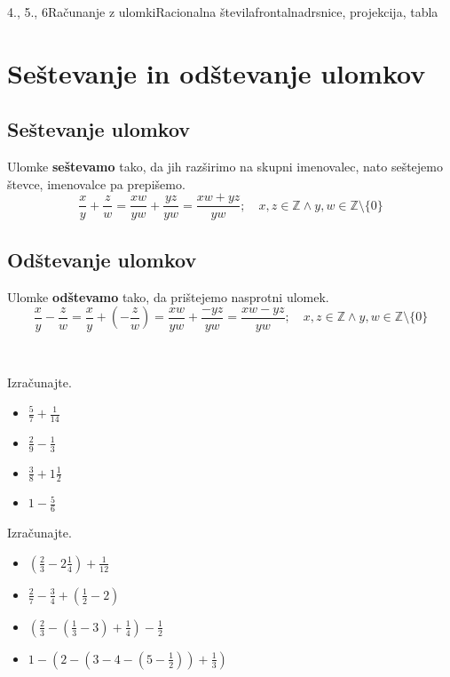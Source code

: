 \begin{priprava}{4., 5., 6}{}{Računanje z ulomki}{Racionalna števila}{frontalna}{drsnice, projekcija, tabla}

    \section{Seštevanje in odštevanje ulomkov}

        
    \subsection*{Seštevanje ulomkov}
        Ulomke \textbf{seštevamo} tako, da jih razširimo na skupni imenovalec, nato seštejemo števce, imenovalce pa prepišemo.
        $$\dfrac{x}{y}+\dfrac{z}{w}=\dfrac{xw}{yw}+\dfrac{yz}{yw}=\dfrac{xw+yz}{yw}; \quad x,z\in\mathbb{Z}\land y,w\in\mathbb{Z}\setminus\{0\} $$
    

    \subsection*{Odštevanje ulomkov}
        Ulomke \textbf{odštevamo} tako, da prištejemo nasprotni ulomek.
        $$\dfrac{x}{y}-\dfrac{z}{w}=\dfrac{x}{y}+\left(-\dfrac{z}{w}\right)=\dfrac{xw}{yw}+\dfrac{-yz}{yw}=\dfrac{xw-yz}{yw}; \quad x,z\in\mathbb{Z}\land y,w\in\mathbb{Z}\setminus\{0\} $$
    



    ~\\


    \begin{naloga}
        Izračunajte.
        \begin{itemize}
            \item $\frac{5}{7}+\frac{1}{14}$ 
            \item $\frac{2}{9}-\frac{1}{3}$ 
            \item $\frac{3}{8}+1\frac{1}{2}$ 
            \item $1-\frac{5}{6}$ 
        \end{itemize}
    \end{naloga}



    \begin{naloga}
        Izračunajte.
        \begin{itemize}
            \item $\left(\frac{2}{3}-2\frac{1}{4}\right)+\frac{1}{12}$ 
            \item $\frac{2}{7}-\frac{3}{4}+\left(\frac{1}{2}-2\right)$ 
            \item $\left(\frac{2}{3}-\left(\frac{1}{3}-3\right)+\frac{1}{4}\right)-\frac{1}{2}$ 
            \item $1-\left(2-\left(3-4-\left(5-\frac{1}{2}\right)\right)+\frac{1}{3}\right)$ 
        \end{itemize}
    \end{naloga}





\end{priprava}
